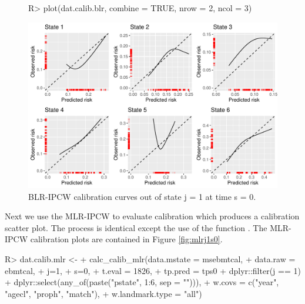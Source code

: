 \documentclass[nojss]{jss}
\begin{document}
\begin{figure}[t!]
\centering
\begin{Schunk}
\begin{Sinput}
R> plot(dat.calib.blr, combine = TRUE, nrow = 2, ncol = 3)
\end{Sinput}
\end{Schunk}
\includegraphics{overview-006}
\caption{\label{fig:blrj1s0} BLR-IPCW calibration curves out of state j =  1 at time s = 0.}
\end{figure}

Next we use the MLR-IPCW to evaluate calibration which produces a calibration scatter plot. The process is identical except the use of the function . The MLR-IPCW calibration plots are contained in Figure \ref{fig:mlrj1s0}.

\begin{Schunk}
\begin{Sinput}
R> dat.calib.mlr <-
+    calc_calib_mlr(data.mstate = msebmtcal,
+                   data.raw = ebmtcal,
+                   j=1,
+                   s=0,
+                   t.eval = 1826,
+                   tp.pred = tps0 %
+                     dplyr::filter(j == 1) %
+                     dplyr::select(any_of(paste("pstate", 1:6, sep = ""))),
+                   w.covs = c("year", "agecl", "proph", "match"),
+                   w.landmark.type = "all")
\end{Sinput}
\end{Schunk}
\end{document}
